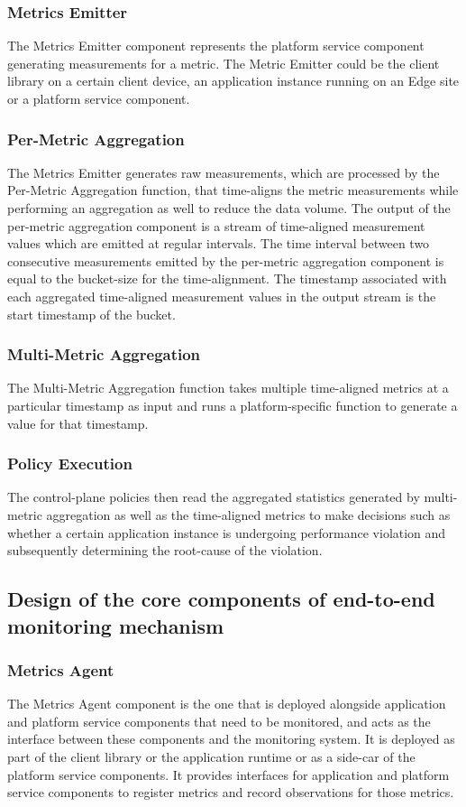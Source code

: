\subsubsection{Metrics Emitter}
The Metrics Emitter component represents the platform service component generating measurements for a metric. The Metric Emitter could be the client library on a certain client device, an application instance running on an Edge site or a platform service component. 
\subsubsection{Per-Metric Aggregation}
The Metrics Emitter generates raw measurements, which are processed by the Per-Metric Aggregation function, that time-aligns the metric measurements while performing an aggregation as well to reduce the data volume. The output of the per-metric aggregation component is a stream of time-aligned measurement values which are emitted at regular intervals. The time interval between two consecutive measurements emitted by the per-metric aggregation component is equal to the bucket-size for the time-alignment. The timestamp associated with each aggregated time-aligned measurement values in the output stream is the start timestamp of the bucket.

\subsubsection{Multi-Metric Aggregation}
The Multi-Metric Aggregation function takes multiple time-aligned metrics at a particular timestamp as input and runs a platform-specific function to generate a value for that timestamp. 

\subsubsection{Policy Execution}
The control-plane policies then read the aggregated statistics generated by multi-metric aggregation as well as the time-aligned metrics to make decisions such as whether a certain application instance is undergoing performance violation and subsequently determining the root-cause of the violation.

\subsection{Design of the core components of end-to-end monitoring mechanism}
\subsubsection{Metrics Agent}
The Metrics Agent component is the one that is deployed alongside application and platform service components that need to be monitored, and acts as the interface between these components and the monitoring system. It is deployed as part of the client library or the application runtime or as a side-car of the platform service components. It provides interfaces for application and platform service components to register metrics and record observations for those metrics. 

